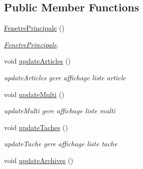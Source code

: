 \subsection*{Public Member Functions}
\begin{DoxyCompactItemize}
\item 
\mbox{\label{class_fenetre_principale_a1226b3f74369ed9d6e577b26d0db11fb}} 
\hyperlink{class_fenetre_principale_a1226b3f74369ed9d6e577b26d0db11fb}{Fenetre\+Principale} ()
\begin{DoxyCompactList}\small\item\em \hyperlink{class_fenetre_principale}{Fenetre\+Principale}. \end{DoxyCompactList}\item 
\mbox{\label{class_fenetre_principale_a7bbe4f01fce9c861569cc9a6c6cb6278}} 
void \hyperlink{class_fenetre_principale_a7bbe4f01fce9c861569cc9a6c6cb6278}{update\+Articles} ()
\begin{DoxyCompactList}\small\item\em update\+Articles gere affichage liste article \end{DoxyCompactList}\item 
\mbox{\label{class_fenetre_principale_a55114ce4cb1a940c917834d15fe811c7}} 
void \hyperlink{class_fenetre_principale_a55114ce4cb1a940c917834d15fe811c7}{update\+Multi} ()
\begin{DoxyCompactList}\small\item\em update\+Multi gere affichage liste multi \end{DoxyCompactList}\item 
\mbox{\label{class_fenetre_principale_a332356aa53313347d58fe5c68288f9d3}} 
void \hyperlink{class_fenetre_principale_a332356aa53313347d58fe5c68288f9d3}{update\+Taches} ()
\begin{DoxyCompactList}\small\item\em update\+Tache gere affichage liste tache \end{DoxyCompactList}\item 
\mbox{\label{class_fenetre_principale_ad8e5e7ebc79b842fd75c59e666ed7255}} 
void \hyperlink{class_fenetre_principale_ad8e5e7ebc79b842fd75c59e666ed7255}{update\+Archives} ()

\end{DoxyCompactItemize}
